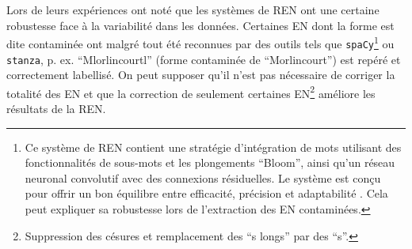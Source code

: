 Lors de leurs expériences \cite{DBLP:conf/gis/Koudoro-Parfait21} %
ont noté que les systèmes de REN ont une certaine robustesse face à la variabilité dans les données. Certaines EN dont la forme est dite \og{}contaminée\fg{} \cite{hamdi:hal-03615997} ont malgré tout été reconnues par des outils tels que \texttt{spaCy}\footnote{Ce système de REN contient une stratégie d'intégration de mots utilisant des fonctionnalités de sous-mots et les plongements ``Bloom'', ainsi qu'un réseau neuronal convolutif avec des connexions résiduelles. Le système est conçu pour offrir un bon équilibre entre efficacité, précision et adaptabilité \cite{bhavani}. Cela peut expliquer sa robustesse lors de l'extraction des EN contaminées.} ou \texttt{stanza}, p. ex. “Mlorlincourtl” (forme contaminée de “Morlincourt”)  est repéré et correctement labellisé. On peut supposer qu'il n'est pas nécessaire de corriger la totalité des EN et que la correction de seulement certaines EN\footnote{Suppression des césures et remplacement des ``s longs'' par des ``s''.} \cite{DBLP:conf/konvens/AlexGKT12} améliore les résultats de la REN. 



